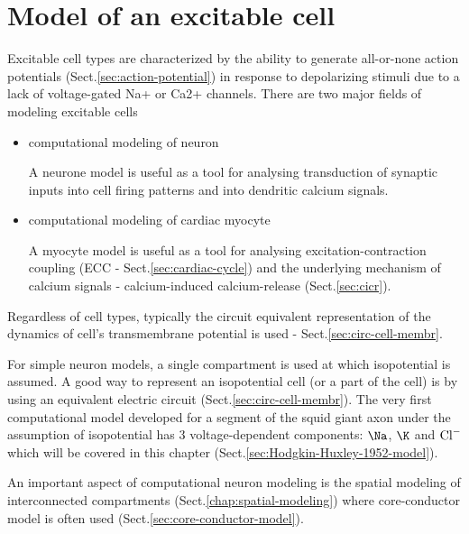 \chapter{Model of an excitable cell}
\label{chap:modeling-excitable-cells}
\label{sec:excitable-cells}

\def\gate{{\text{gate}}}
\def\shut{{\text{shut}}}
\def\open{{\text{open}}}
\def\rise{{\text{rise}}}
\def\decay{{\text{decay}}}
\def\ms{{\text{ms}}}

Excitable cell types are characterized by the ability to generate all-or-none
action potentials (Sect.\ref{sec:action-potential}) in response to depolarizing
stimuli due to a lack of voltage-gated Na+ or Ca2+ channels. There are two major
fields of modeling excitable cells

\begin{itemize}
  \item computational modeling of neuron

A neurone model is useful as a tool for analysing  transduction of synaptic
inputs into cell firing patterns and into dendritic calcium signals.

  \item computational modeling of cardiac myocyte

A myocyte model is useful as a tool for analysing excitation-contraction
coupling (ECC - Sect.\ref{sec:cardiac-cycle}) and the underlying
mechanism of calcium signals - calcium-induced calcium-release
(Sect.\ref{sec:cicr}).

\end{itemize}
Regardless of cell types, typically the circuit equivalent representation of the
dynamics of cell's transmembrane potential is used -
Sect.\ref{sec:circ-cell-membr}. 


For simple neuron models, a single compartment is used at which isopotential is
assumed. A good way to represent an isopotential cell (or a part of the cell) is
by using an equivalent electric circuit (Sect.\ref{sec:circ-cell-membr}).
The very first computational model developed for a segment of the squid giant
axon under the assumption of isopotential has 3 voltage-dependent components:
$\Na$, $\K$ and ${\text{Cl}^{-}}$ which will be
covered in this chapter (Sect.\ref{sec:Hodgkin-Huxley-1952-model}).


An important aspect of computational neuron modeling is the spatial modeling of
interconnected compartments (Sect.\ref{chap:spatial-modeling}) where
core-conductor model is often used (Sect.\ref{sec:core-conductor-model}).

